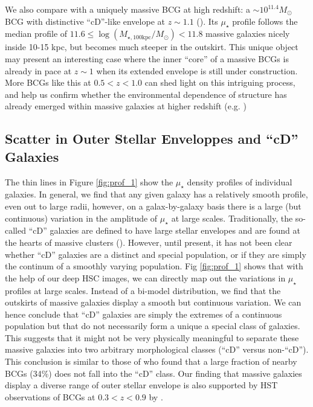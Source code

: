 \documentclass[a4paper,fleqn,usenatbib]{mnras}
\def\logmtot{{$\log (M_{\star,100\mathrm{kpc}}/M_{\odot})$}}
\def\mden{{$\mu_{\star}$}}
\begin{document}
    We also compare with a uniquely massive BCG at high redshift: 
    a ${\sim} 10^{11.4} M_{\odot}$ BCG with distinctive ``cD''-like envelope at 
    $z{\sim} 1.1$ (\citealt{Liu2013}).  
    Its \mden{} profile follows the median profile of $11.6\leq$\logmtot{}$<11.8$ 
    massive galaxies nicely inside 10-15 kpc, but becomes much steeper in the outskirt.  
    This unique object may present an interesting case where the inner ``core'' of a 
    massive BCGs is already in pace at $z{\sim} 1$ when its extended envelope is still
    under construction.
    More BCGs like this at $0.5 < z < 1.0$ can shed light on this intriguing 
    process, and help us confirm whether the environmental dependence of structure 
    has already emerged within massive galaxies at higher redshift 
    (e.g. \citealt{Papovich2012})

    
\subsection{Scatter in Outer Stellar Enveloppes and ``cD'' Galaxies}
        
   The thin lines in Figure \ref{fig:prof_1} show the \mden{} density profiles of 
   individual galaxies. 
   In general, we find that any given galaxy has a relatively smooth profile, even out 
   to large radii, however, on a galax-by-galaxy basis there is a large (but continuous) 
   variation in the amplitude of \mden{} at large scales. 
   Traditionally, the so-called ``cD'' galaxies are defined to have large stellar 
   envelopes and are found at the hearts of massive clusters (\citealt{Matthews1964, 
   Schombert1988}). 
   However, until present, it has not been clear whether ``cD'' galaxies are a distinct 
   and special population, or if they are simply the continum of a smoothly varying 
   population. 
   Fig \ref{fig:prof_1} shows that with the help of our deep HSC images, we can directly 
   map out the variations in \mden{} profiles at large scales. 
   Instead of a bi-model distribution, we find that the outskirts of massive galaxies 
   display a smooth but continuous variation. 
   We can hence conclude that ``cD'' galaxies are simply the extremes of a continuous 
   population but that do not necessarily form a unique a special class of galaxies. 
   This suggests that it might not be very physically meaningful to separate these 
   massive galaxies into two arbitrary morphological classes (``cD'' versus non-``cD''). 
   This conclusion is similar to those of \citep{Zhao2015} who found that a large 
   fraction of nearby BCGs (34\%) does not fall into the ``cD'' class. 
   Our finding that massive galaxies display a diverse range of outer stellar 
   envelope is also supported by HST observations of BCGs at $0.3 < z <0.9$ 
   by \citealt{Bai2014}.
   
\end{document}
